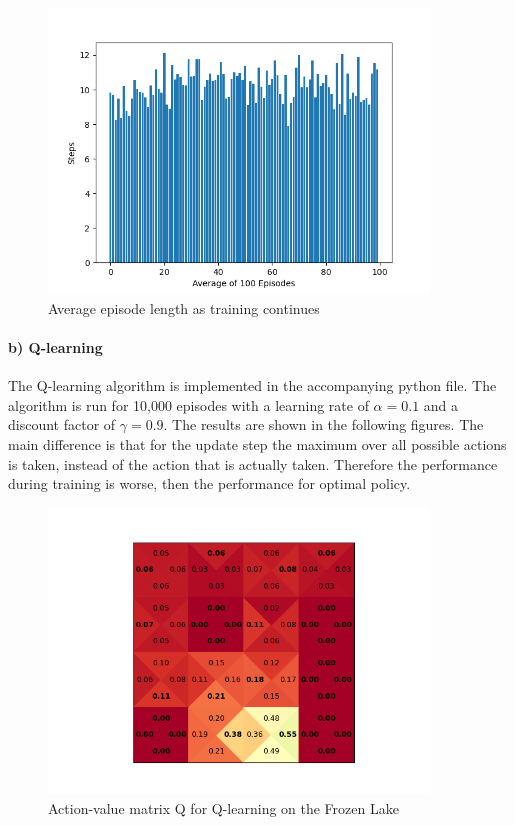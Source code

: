 \documentclass{article}
\begin{document}
\begin{figure}[H]
\centering
\includegraphics[width=0.9\textwidth]{figures/Avg_Episode_sarsa.png}
\caption{Average episode length as training continues}
\label{fig:avg_sarsa}
\end{figure}

\paragraph*{b) Q-learning}

The Q-learning algorithm is implemented in the accompanying python file. The algorithm is run for 10,000 episodes with a learning rate of $\alpha = 0.1$ and a discount factor of $\gamma = 0.9$. The results are shown in the following figures. The main difference is that for the update step the maximum over all possible actions is taken, instead of the action that is actually taken. Therefore the performance during training is worse, then the performance for optimal policy.

\begin{figure}[H]
\centering
\includegraphics[width=0.9\textwidth]{figures/Q_q_slippery.png}
\caption{Action-value matrix Q for Q-learning on the Frozen Lake}
\label{fig:Q_q}
\end{figure}
\end{document}
